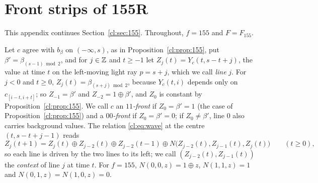 \section{Front strips of 155R}\label{app:155}

This appendix continues Section~\ref{cl:sec:155}. Throughout, $f=155$ and $F=F_{155}$.

Let $c$ agree with $b_\beta$ on $(-\infty,s)$, as in Proposition~\ref{cl:prop:155}, put $\beta'=\beta_{(s-1)\bmod2}$, and for $j\in\mathbb{Z}$ and $t\ge-1$ let $Z_j(t)=Y_c(t,s-t+j)$, the value at time $t$ on the left-moving light ray $p=s+j$, which we call \emph{line} $j$. For $j<0$ and $t\ge0$, $Z_j(t)=\beta_{(s+j)\bmod2}$, because $Y_c(t,i)$ depends only on $c_{[i-t,i+t]}$; so $Z_{-1}=\beta'$ and $Z_{-2}=1\oplus\beta'$, and $Z_0$ is constant by Proposition~\ref{cl:prop:155}. We call $c$ an \emph{$11$-front} if $Z_0=\beta'=1$ (the case of Proposition~\ref{cl:prop:155}) and a \emph{$00$-front} if $Z_0=\beta'=0$; if $Z_0\ne\beta'$, line $0$ also carries background values. The relation \eqref{cl:eq:wave} at the centre $(t,s-t+j-1)$ reads
\begin{equation}\label{cl:eq:strip}
Z_j(t+1)=Z_j(t)\oplus Z_{j-2}(t)\oplus Z_{j-2}(t-1)\oplus N\bigl(Z_{j-2}(t),Z_{j-1}(t),Z_j(t)\bigr)\qquad(t\ge0),
\end{equation}
so each line is driven by the two lines to its left; we call $(Z_{j-2}(t),Z_{j-1}(t))$ the \emph{context} of line $j$ at time $t$. For $f=155$, $N(0,0,z)=1\oplus z$, $N(1,1,z)=1$ and $N(0,1,z)=N(1,0,z)=0$.

